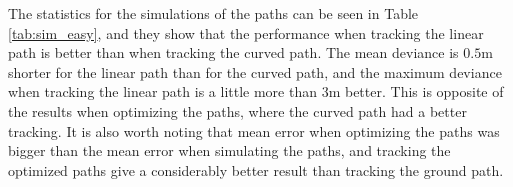 The statistics for the simulations of the paths can be seen in Table \ref{tab:sim_easy}, and they show that the performance when tracking the linear path is better than when tracking the curved path. The mean deviance is $0.5$m shorter for the linear path than for the curved path, and the maximum deviance when tracking the linear path is a little more than $3$m better. This is opposite of the results when optimizing the paths, where the curved path had a better tracking. It is also worth noting that mean error when optimizing the paths was bigger than the mean error when simulating the paths, and tracking the optimized paths give a considerably better result than tracking the ground path.